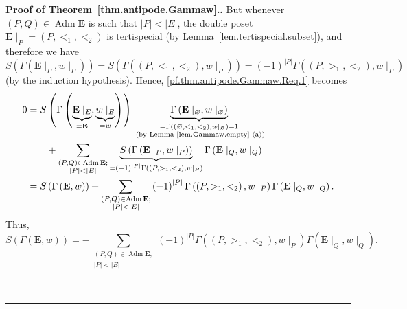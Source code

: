 \documentclass[numbers=enddot,12pt,final,onecolumn,notitlepage,abstracton]{scrartcl}
\theoremstyle{definition}
\newenvironment{proof}[1][Proof]{\noindent\textbf{#1.} }{\ \rule{0.5em}{0.5em}}
\let\sumnonlimits\sum
\renewcommand{\sum}{\sumnonlimits\limits}
\newenvironment{vershort}{}{}
\newcommand{\Adm}{\operatorname{Adm}}
\newcommand{\EE}{{\mathbf{E}}}
\begin{document}
\begin{proof}[Proof of Theorem~\ref{thm.antipode.Gammaw}.]
\begin{vershort}
But whenever $\left(P, Q\right) \in \Adm \EE$ is such that
$\left|P\right| < \left|E\right|$, the double poset
$\EE\mid_P = \left(P, <_1, <_2\right)$ is tertispecial
(by Lemma~\ref{lem.tertispecial.subset}), and
therefore we have
$S\left(\Gamma\left(\EE\mid_P, w\mid_P\right)\right)
= S\left(\Gamma\left(\left(P, <_1, <_2\right), w\mid_P\right)\right)
= \left(-1\right)^{\left|P\right|}
\Gamma\left(\left(P, >_1, <_2\right), w\mid_P\right)$
(by the induction hypothesis).
Hence,
\eqref{pf.thm.antipode.Gammaw.Req.1} becomes
\begin{align}
0
&= S \left(\Gamma\left(\underbrace{\EE\mid_E}_{=\EE},
           \underbrace{w\mid_E}_{=w}\right)\right)
  \underbrace{\Gamma\left(\EE\mid_\varnothing, w\mid_\varnothing\right)
             }_{\substack{
             =\Gamma\left(\left(\varnothing, <_1, <_2\right), w\mid_\varnothing\right)
             =1 \\ \text{ (by Lemma \ref{lem.Gammaw.empty} (a))}}}
     \nonumber \\
& \qquad + \sum_{\substack{\left(P, Q\right) \in \Adm \EE ; \\
                  \left|P\right| < \left|E\right|}}
  \underbrace{S\left(\Gamma\left(\EE\mid_P, w\mid_P\right)\right)
             }_{= \left(-1\right)^{\left|P\right|}
                  \Gamma\left(\left(P, >_1, <_2\right), w\mid_P\right)}
  \Gamma\left(\EE\mid_Q, w\mid_Q\right)
     \nonumber \\
& = S\left(\Gamma\left(\EE, w\right)\right)
  + \sum_{\substack{\left(P, Q\right) \in \Adm \EE ; \\
                  \left|P\right| < \left|E\right|}}
  \left(-1\right)^{\left|P\right|}
  \Gamma\left(\left(P, >_1, <_2\right), w\mid_P\right)
  \Gamma\left(\EE\mid_Q, w\mid_Q\right) .
\nonumber
\end{align}
Thus,
\begin{equation}
S\left(\Gamma\left(\EE, w\right)\right)
= - \sum_{\substack{\left(P, Q\right) \in \Adm \EE ; \\
                  \left|P\right| < \left|E\right|}}
\left(-1\right)^{\left|P\right|}
\Gamma\left(\left(P, >_1, <_2\right), w\mid_P\right)
\Gamma\left(\EE\mid_Q, w\mid_Q\right) .
\label{pf.thm.antipode.Gammaw.Seq}
\end{equation}
\end{vershort}


\end{proof}
\end{document}
